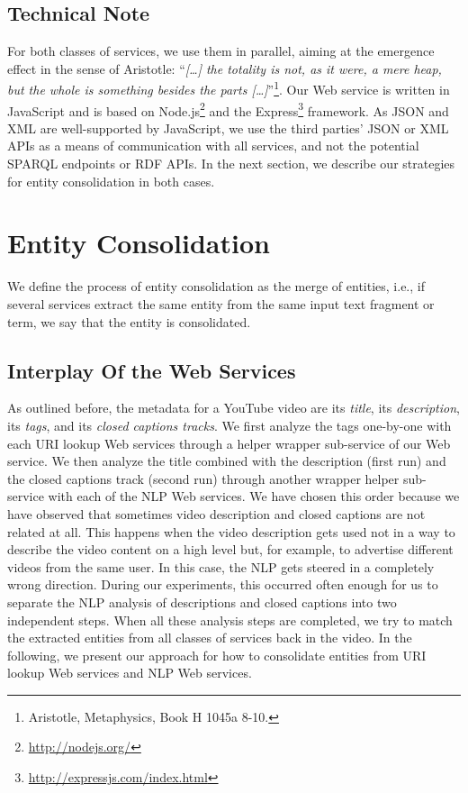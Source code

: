 \documentclass[conference]{IEEEtran}
\begin{document}
\subsection{Technical Note}                                                 \label{sec:technicalnote}
For both classes of services, we use them in parallel, aiming at the emergence effect in the sense of Aristotle:
``\emph{[\ldots] the totality is not, as it were, a mere heap, but the whole is something besides the parts
[\ldots]}''\footnote{Aristotle, Metaphysics, Book H 1045a 8-10.}. Our Web service is written in JavaScript and is based
on Node.js\footnote{\url{http://nodejs.org/}} and the Express\footnote{\url{http://expressjs.com/index.html}} framework.
As JSON and XML are well-supported by JavaScript, we use the third parties' JSON or XML APIs as a means of communication with all services, and not the
potential SPARQL endpoints or RDF APIs. In the next section, we describe our strategies for entity consolidation in
both cases.


\section{Entity Consolidation}                                              \label{sec:consolidation}
We define the process of entity consolidation as the merge of entities, i.e., if several services extract the same
entity from the same input text fragment or term, we say that the entity is consolidated.

\subsection{Interplay Of the Web Services}                                  \label{sec:interplay}
As outlined before, the metadata for a YouTube video are its \textit{title}, its \textit{description}, its \textit{tags}, and its \textit{closed captions
tracks}. We first analyze the tags one-by-one with each URI lookup Web services through a helper wrapper sub-service of our Web service. We then
analyze the title combined with the description (first run) and the closed captions track (second run) through another wrapper helper sub-service with each of the NLP Web services. We have chosen this order because we have observed that sometimes video description
and closed captions are not related at all. This happens when the video description gets used not in a way to describe
the video content on a high level but, for example, to advertise different videos from the same user. In this case, the
NLP gets steered in a completely wrong direction. During our experiments, this occurred often enough for us to separate
the NLP analysis of descriptions and closed captions into two independent steps. When all these analysis steps are completed,
we try to match the extracted entities from all classes of services back in the video. In the following, we present our
approach for how to consolidate entities from URI lookup Web services and NLP Web services.
\end{document}
